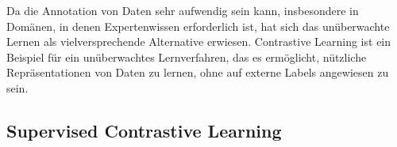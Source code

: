Da die Annotation von Daten sehr aufwendig sein kann, insbesondere in Domänen, in denen Expertenwissen erforderlich ist, hat sich das unüberwachte Lernen als vielversprechende Alternative erwiesen. Contrastive Learning ist ein Beispiel für ein unüberwachtes Lernverfahren, das es ermöglicht, nützliche Repräsentationen von Daten zu lernen, ohne auf externe Labels angewiesen zu sein.




\subsection{Supervised Contrastive Learning} \label{subsec-sup-contrastive}



